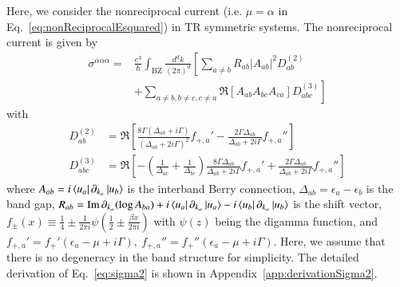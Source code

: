 \documentclass[twocolumn,superscriptaddress]{revtex4-1}
\newcommand{\smrm}[1]{_{\mathrm{#1}}}
\begin{document}
Here, we consider the nonreciprocal current (i.e. $\mu=\alpha$ in Eq.~\eqref{eq:nonReciprocalEsquared}) in TR symmetric systems.
The nonreciprocal current is given by
\begin{align}
  \sigma^{\alpha\alpha\alpha}=& \frac{e^3}{\hbar} \int\smrm{BZ}\frac{d^d k}{(2\pi)^d}\left[\sum_{a\neq b}R_{ab}|A_{ab}|^2D^{(2)}_{ab}\right.\nonumber \\
  &\left.+\sum_{a\neq b,b\neq c,c\neq a}\Re[A_{ab}A_{bc}A_{ca}]D^{(3)}_{abc} \right] \label{eq:sigma2}
\end{align}
with
\begin{align}
  D^{(2)}_{ab}&=\Re \left[\frac{8\Gamma (\Delta_{ab}+i\Gamma)}{(\Delta_{ab}+2i\Gamma)^2}f_{+,a}'-\frac{2\Gamma \Delta_{ab}}{\Delta_{ab}+2i\Gamma}f_{+,a}''\right] \\
  D^{(3)}_{abc}&=\Re\left[-\left(\frac{1}{\Delta_{ac}}+\frac{1}{\Delta_{bc}}\right)\frac{8\Gamma\Delta_{ab}}{\Delta_{ab}+2i\Gamma}f_{+,a}'+\frac{2\Gamma\Delta_{ab}}{\Delta_{ab}+2i\Gamma}f_{+,a}''\right]
\end{align}
where $A_{ab}=i\bra{u_a}\partial_{k_\alpha} \ket{u_b}$ is the interband Berry connection, $\Delta_{ab}=\epsilon_a-\epsilon_b$ is the band gap, $R_{ab}=\Im \partial_{k_\alpha}( \log A_{ba})+i\bra{u_a}\partial_{k_\alpha}\ket{u_a}-i\bra{u_b}\partial_{k_\alpha}\ket{u_b}$ is the shift vector, $f_{\pm}(x)\equiv \frac{1}{4}\pm \frac{1}{2\pi i}\psi\left(\frac{1}{2}\pm \frac{\beta x}{2\pi i}\right)$ with $\psi(z)$ being the digamma function, and $f_{+,a}'=f_+'(\epsilon_a-\mu+i\Gamma),\ f_{+,a}''=f_+''(\epsilon_a-\mu+i\Gamma)$.
Here, we assume that there is no degeneracy in the band structure for simplicity.
The detailed derivation of Eq.~\eqref{eq:sigma2} is shown in Appendix~\ref{app:derivationSigma2}.
\end{document}
